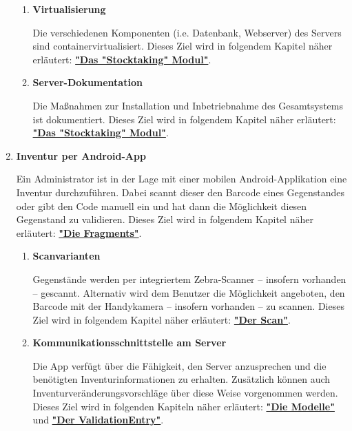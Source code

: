 \documentclass[
    headings=optiontotocandhead,%
    twoside,
    numbers=noenddot,%
    toc=flat, %
    12pt, %
    titlepage, %
    parskip=full, %
    listof=totoc, %
    listof=flat, %
    numbers=noenddot, %
    bibliography=totoc, %
    a4paper,DIV=14,
    BCOR=15mm,
]{scrbook}
\begin{document}
\begin{enumerate}
\begin{enumerate}
      \item	\textbf{Virtualisierung}

      Die verschiedenen Komponenten (i.e. Datenbank, Webserver) des Servers sind containervirtualisiert.  
      Dieses Ziel wird in folgendem Kapitel näher erläutert: \textbf{\href{das-stocktaking-modul}{"Das "Stocktaking" Modul"}}.

      \item	\textbf{Server-Dokumentation}

      Die Maßnahmen zur Installation und Inbetriebnahme des Gesamtsystems ist dokumentiert.
      Dieses Ziel wird in folgendem Kapitel näher erläutert: \textbf{\href{das-stocktaking-modul}{"Das "Stocktaking" Modul"}}.
    \end{enumerate}







      \item \textbf{Inventur per Android-App}

      Ein Administrator ist in der Lage mit einer mobilen Android-Applikation eine Inventur durchzuführen. Dabei scannt dieser den Barcode eines Gegenstandes oder gibt den Code manuell ein und hat dann die Möglichkeit diesen Gegenstand zu validieren. 
      Dieses Ziel wird in folgendem Kapitel näher erläutert: \textbf{\href{die-fragments}{"Die Fragments"}}.
      
      \begin{enumerate}
        \item	\textbf{Scanvarianten}

        Gegenstände werden per integriertem Zebra-Scanner – insofern vorhanden – gescannt. Alternativ wird dem Benutzer die Möglichkeit angeboten, den Barcode mit der Handykamera – insofern vorhanden – zu scannen. 
        Dieses Ziel wird in folgendem Kapitel näher erläutert: \textbf{\href{TODO}{"Der Scan"}}.
      
        \item	\textbf{Kommunikationsschnittstelle am Server}

        Die App verfügt über die Fähigkeit, den Server anzusprechen und die benötigten Inventurinformationen zu erhalten. Zusätzlich können auch Inventurveränderungsvorschläge über diese Weise vorgenommen werden.
        Dieses Ziel wird in folgenden Kapiteln näher erläutert: \textbf{\href{die-modelle}{"Die Modelle"}} und \textbf{\href{der-validationentry}{"Der ValidationEntry"}}.
        

\end{enumerate}
\end{enumerate}
\end{document}
